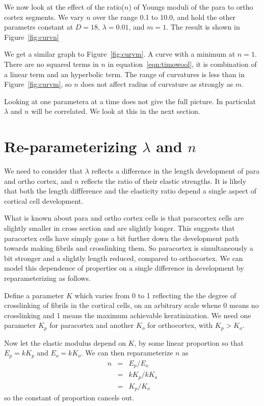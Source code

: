 \documentclass[titlepage]{article}  %
\begin{document}
We now look at the effect of the ratio($n$) of Youngs moduli  of the para to ortho cortex segments. We vary $n$ over the range 0.1 to 10.0, and hold the other parametrs constant at $D=18$, $\lambda=0.01$, and $m=1$. The result is shown in Figure~\ref{fig:curvn}

We get a similar graph to Figure~\ref{fig:curvm}. A curve with a minimum at $n=1$. There are no squared terms in $n$ in equation~\ref{eqn:timowool}, it is combination of a linear term and an hyperbolic term. The range of curvatures is less than in Figure~\ref{fig:curvm}, so $n$ does not affect radius of curvature as strongly as $m$.

Looking at one parametera at a time  does not give the full picture. In particulat $\lambda$ and $n$ will be correlated. We look at this in the next section.

\section{Re-parameterizing $\lambda$ and $n$}
We need to consider that $\lambda$ reflects a difference in the length development of para and ortho cortex, and $n$ reflects the ratio of their elastic strengths. It is likely that both the length diffference and the elasticity ratio depend a single aspect of cortical cell development.

What is known about para and ortho cortex cells is that paracortex cells are slightly smaller in cross section and are slightly longer. This suggests that paracortex cells have simply gone a bit further down the development path towards making fibrils and crosslinking them. So paracortex is simultaneously a bit stronger and a slightly length reduced, compared to orthocortex. We can model this dependence of properties on a single difference in development by reparameterizing as follows.

Define a parameter $K$ which varies from 0 to 1 reflecting the the degree of crosslinking of fibrils in the cortical cells, on an arbitrary scale whene 0 means no crosslinking and 1 means the maximum achievable keratinization. We need one parameter $K_{p}$ for paracortex and another $K_{o}$ for orthocortex, with $K_{p} > K_{o}$. 

Now let the elastic modulus depend on $K$, by some linear proportion so that $E_{p} = k K_{p}$ and $E_{o} = k K_{o}$. We can then reparameterize $n$ as 
\begin{eqnarray*}
n & = & E_{p} / E_{o} \\
  & = & k K_{p} / k K_{o} \\
  & = & K_{p} / K_{o}
\end{eqnarray*}
 so the constant of proportion cancels out. 
\end{document}
